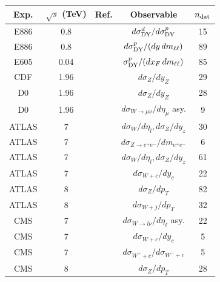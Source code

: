 \documentclass[withindex,glossary]{cam-thesis}
\begin{document}
\begin{table}[H]
  \begin{center}
  \renewcommand{\arraystretch}{1.20}
\small
\begin{tabular}{ c c c c c }
 \toprule
 Exp.   & $\sqrt{s}$ (TeV) & Ref. & Observable & $n_{\rm dat}$ \\
 \midrule
 E886   & 0.8   & \cite{Towell:2001nh}            & $d\sigma^d_{\rm DY}/d\sigma^p_{\rm DY}$ & 15 \\
 E886   & 0.8   & \cite{Webb:2003ps, Webb:2003bj} & $d\sigma^p_{\rm DY}/(dy\,dm_{\ell\ell})$     & 89 \\
 \midrule
 E605   & 0.04  & \cite{Moreno:1990sf}            & $\sigma^p_{\rm DY}/(dx_F\,dm_{\ell\ell})$    & 85 \\
 \midrule
 CDF    & 1.96  & \cite{Aaltonen:2010zza}         & $d\sigma_Z/dy_Z$                     & 29 \\
 \midrule
 D0     & 1.96  & \cite{Abazov:2007jy}            & $d\sigma_Z/dy_Z$                     & 28 \\
 D0     & 1.96  & \cite{Abazov:2013rja}		  & $d\sigma_{W\to \mu \nu}/d\eta_\mu$ asy.  & 9 \\
 \midrule
 ATLAS  & 7     & \cite{Aad:2011dm}               & $d\sigma_W/d\eta_l,d\sigma_Z/dy_z$     & 30 \\
 ATLAS  & 7     & \cite{Aad:2014qja}              & $d\sigma_{Z\rightarrow e^+e^-}/dm_{e^+e^-}$  & 6 \\
 ATLAS  & 7     & \cite{Aaboud:2016btc}           & $d\sigma_W/d\eta_l,d\sigma_Z/dy_z$     & 61 \\
 ATLAS  & 7 	& \cite{Aad:2014xca}	          & $d\sigma_{W+c}/dy_c$	          & 22 \\
 ATLAS  & 8     & \cite{Aad:2015auj}              & $d\sigma_Z/dp_T$                       & 82 \\
 ATLAS  & 8 	& \cite{Aaboud:2017soa}		  & $d\sigma_{W+j}/dp_T$			  & 32 \\
 \midrule
 CMS 	& 7	& \cite{Chatrchyan:2012xt}	  & $d\sigma_{W\to l\nu}/d\eta_\ell$ asy.	          & 22 \\
 CMS 	& 7 	& \cite{Chatrchyan:2013uja}	  & $d\sigma_{W+c}/dy_c$		  & 5 \\
 CMS 	& 7 	& \cite{Chatrchyan:2013uja}	  & $d\sigma_{W^{+}+c}/d\sigma_{W^{-}+c}$	  & 5 \\
 CMS    & 8     & \cite{Khachatryan:2015oaa}      & $d\sigma_Z/dp_T$                       & 28 \\

\end{tabular}
\end{center}
\end{table}
\end{document}
